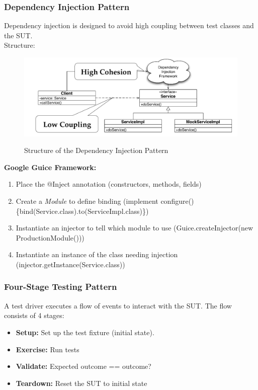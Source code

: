 \subsubsection{Dependency Injection Pattern}
Dependency injection is designed to avoid high coupling between test classes and the SUT.\\
Structure:\\
\begin{figure}[H]
  \centering
  \includegraphics[width=\linewidth]{images/testing_pattern_dependency_injection.png}\\
  \caption{Structure of the Dependency Injection Pattern}
\end{figure}
\textbf{Google Guice Framework:}
\begin{enumerate}
  \item Place the @Inject annotation (constructors, methods, fields)
  \item Create a \textit{Module} to define binding (implement configure()\{bind(Service.class).to(ServiceImpl.class)\})
  \item Instantiate an injector to tell which module to use (Guice.createInjector(new ProductionModule()))
  \item Instantiate an instance of the class needing injection (injector.getInstance(Service.class))
\end{enumerate}
\newpage

\subsubsection{Four-Stage Testing Pattern}
A test driver executes a flow of events to interact with the SUT.
The flow consists of 4 stages:
\begin{itemize}
  \item \textbf{Setup:} Set up the test fixture (initial state).
  \item \textbf{Exercise:} Run tests
  \item \textbf{Validate:} Expected outcome == outcome?
  \item \textbf{Teardown:} Reset the SUT to initial state
\end{itemize}
\newpage

